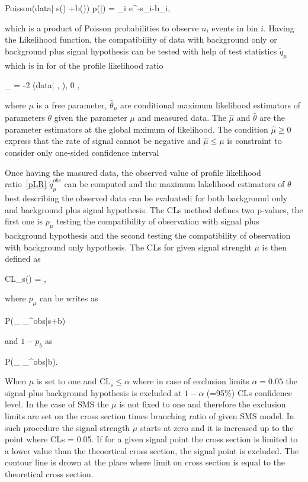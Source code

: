 {
Poisson(data| \mu s(\theta) +b(\theta)) p(\tilde{\theta}|\theta) = \prod_{i}  e^{-\mu s_{i}-b_{i}},
}

which is a product  of Poisson probabilities to observe $n_{i}$ events in bin $i$. Having the Likelihood function, the compatibility of data with background only or background plus signal hypothesis can be tested with help of test statistics $\tilde{q}_{\mu}$ which is in for of the profile likelihood ratio

{
_{\mu} = -2   {(data| \hat{\mu} , \hat{\theta})}, 0 \leq \hat{\mu} \leq \mu ,
}

where $\mu$ is a free parameter, $\hat{\theta}_{\mu}$ are conditional maximum likelihood estimators of parameters $\theta$ given the parameter $\mu$ and measured data. The $\hat{\mu}$ and $\hat{\theta}$ are the parameter estimators at the global mximum of likelihood. The condition $\hat{\mu} \geq 0 $ express that the rate of signal cannot be negative and $\hat{\mu} \leq \mu $ is constraint to consider only one-sided confidence interval 
	  
Once having the masured data, the observed value of profile likelihood ratio~\ref{pLR} $\tilde{q}_{\mu}^{obs}$ can be computed and the maximum lakelihood estimators of $\theta$ best describing the observed data can be evaluatedi for both background only and background plus signal hypothesis. The CLs method defines two p-values, the first one is $p_{\mu}$ testing the compatibility of observation with signal plus background hypothesis and the second testing the compatibility of observation with background only hypothesis. The CLs for given signal strenght $\mu$ is then defined as

{
CL_{s}(\mu) = ,
}

where $p_{\mu}$ can be writes as

{
P(_{\mu} \geq {}_{\mu}^{obs}|s+b)
}

and $1-p_{b}$ as

{
P(_{\mu} \geq {}_{\mu}^{obs}|b).
}

When $\mu$ is set to one and $\mathrm{CL_{s}} \leq \alpha $ where in case of exclusion limits $\alpha = 0.05$ the signal plus background hypothesis is excluded at $1-\alpha$ (=95\%) CLs confidence level. In the case of SMS the $\mu$ is not fixed to one and therefore the exclusion limits are set on the cross section times branching ratio of given SMS model. In such procedure the signal strength $\mu$ starts at zero and it is increased up to the point where CLs = 0.05. If for a given signal point the cross section is limited to a lower value than the theoertical cross section, the signal point is excluded. The contour line is drown at the place where limit on cross section is equal to the theoretical cross section.

